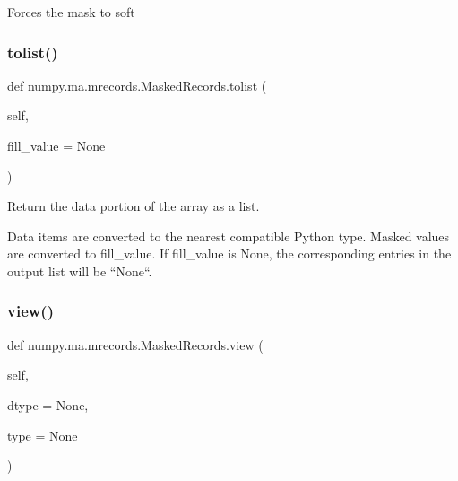 \begin{DoxyVerb}Forces the mask to soft\end{DoxyVerb}
 \mbox{\label{classnumpy_1_1ma_1_1mrecords_1_1MaskedRecords_aa2e69f8be6671386e2968ed9ce2fa188}} 
\subsubsection{\texorpdfstring{tolist()}{tolist()}}
{\footnotesize\ttfamily def numpy.\+ma.\+mrecords.\+Masked\+Records.\+tolist (\begin{DoxyParamCaption}\item[{}]{self,  }\item[{}]{fill\+\_\+value = {\ttfamily None} }\end{DoxyParamCaption})}

\begin{DoxyVerb}Return the data portion of the array as a list.

Data items are converted to the nearest compatible Python type.
Masked values are converted to fill_value. If fill_value is None,
the corresponding entries in the output list will be ``None``.\end{DoxyVerb}
 \mbox{\label{classnumpy_1_1ma_1_1mrecords_1_1MaskedRecords_ad5efe5e740d35464afb9ad5ed33a6f51}} 
\subsubsection{\texorpdfstring{view()}{view()}}
{\footnotesize\ttfamily def numpy.\+ma.\+mrecords.\+Masked\+Records.\+view (\begin{DoxyParamCaption}\item[{}]{self,  }\item[{}]{dtype = {\ttfamily None},  }\item[{}]{type = {\ttfamily None} }\end{DoxyParamCaption})}

